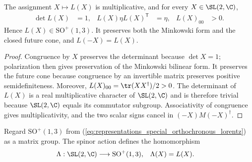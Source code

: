 \begin{theorem}
    \label{thm:spinor_image_special_orthochronous}
    \leanok
    The assignment $X\mapsto L(X)$ is multiplicative, and for every
    $X\in\SL(2,\C)$,
    \begin{align}
        \det L(X)&=1,
        &L(X)\eta L(X)^{\mathsf T}&=\eta,
        &L(X)_{00}&>0.
        \label{eq:representations_spinor_lorentz_membership}
    \end{align}
    Hence $L(X)\in\mathrm{SO}^+(1,3)$.  It preserves both the Minkowski
    form and the closed future cone, and $L(-X)=L(X)$.
\end{theorem}

\begin{proof}\leanok
    Congruence by $X$ preserves the determinant because $\det X=1$;
    polarization then gives preservation of the Minkowski bilinear form.
    It preserves the future cone because congruence by an invertible matrix
    preserves positive semidefiniteness.  Moreover,
    $L(X)_{00}=\tr(XX^\dagger)/2>0$.  The determinant of $L(X)$ is a real
    multiplicative character of $\SL(2,\C)$ and is therefore trivial because
    $\SL(2,\C)$ equals its commutator subgroup.  Associativity of congruence
    gives multiplicativity, and the two scalar signs cancel in
    $(-X)M(-X)^\dagger$.
\end{proof}

\begin{definition}
    \label{def:spinor_cover_homomorphism}
    \leanok
    Regard $\mathrm{SO}^+(1,3)$ from
    (\ref{eq:representations_special_orthochronous_lorentz}) as a matrix
    group.  The spinor action defines the homomorphism
    \begin{align}
        \Lambda:\SL(2,\C)&\longrightarrow\mathrm{SO}^+(1,3),
        &\Lambda(X)&=L(X).
        \label{eq:representations_spinor_cover_hom}
    \end{align}
\end{definition}

